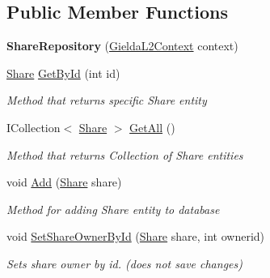 \subsection*{Public Member Functions}
\begin{DoxyCompactItemize}
\item 
\mbox{\label{class_gielda_l2_1_1_i_n_f_r_a_s_t_r_u_c_t_u_r_e_1_1_repositories_1_1_share_repository_ad2fa3231e118e3fb79dc917aefcdc31c}} 
{\bfseries Share\+Repository} (\mbox{\hyperlink{class_gielda_l2_1_1_d_b_1_1_gielda_l2_context}{Gielda\+L2\+Context}} context)
\item 
\mbox{\hyperlink{class_gielda_l2_1_1_d_b_1_1_entities_1_1_share}{Share}} \mbox{\hyperlink{class_gielda_l2_1_1_i_n_f_r_a_s_t_r_u_c_t_u_r_e_1_1_repositories_1_1_share_repository_ac034dd25c3630f8641baf9e7eafe94db}{Get\+By\+Id}} (int id)
\begin{DoxyCompactList}\small\item\em Method that returns specific Share entity \end{DoxyCompactList}\item 
I\+Collection$<$ \mbox{\hyperlink{class_gielda_l2_1_1_d_b_1_1_entities_1_1_share}{Share}} $>$ \mbox{\hyperlink{class_gielda_l2_1_1_i_n_f_r_a_s_t_r_u_c_t_u_r_e_1_1_repositories_1_1_share_repository_aef8271595f290092d8b99d4789c8f37c}{Get\+All}} ()
\begin{DoxyCompactList}\small\item\em Method that returns Collection of Share entities \end{DoxyCompactList}\item 
void \mbox{\hyperlink{class_gielda_l2_1_1_i_n_f_r_a_s_t_r_u_c_t_u_r_e_1_1_repositories_1_1_share_repository_ab72f6f527449750b41956b564c892a7c}{Add}} (\mbox{\hyperlink{class_gielda_l2_1_1_d_b_1_1_entities_1_1_share}{Share}} share)
\begin{DoxyCompactList}\small\item\em Method for adding Share entity to database \end{DoxyCompactList}\item 
void \mbox{\hyperlink{class_gielda_l2_1_1_i_n_f_r_a_s_t_r_u_c_t_u_r_e_1_1_repositories_1_1_share_repository_a6843f1b6e31ecc35b15c6b677ed098a9}{Set\+Share\+Owner\+By\+Id}} (\mbox{\hyperlink{class_gielda_l2_1_1_d_b_1_1_entities_1_1_share}{Share}} share, int ownerid)
\begin{DoxyCompactList}\small\item\em Sets share owner by id. (does not save changes) \end{DoxyCompactList}\item 

\end{DoxyCompactItemize}
